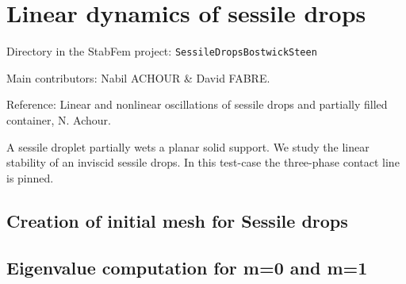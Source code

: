 


\chapter{Linear dynamics of sessile drops}

\begin{description}
\item{Directory in the StabFem project:}  \texttt{SessileDropsBostwickSteen}
\item{Main contributors:} Nabil ACHOUR \& David FABRE.
\item{Reference:} Linear and nonlinear oscillations of sessile drops and partially filled container, N. Achour.  
\end{description}

A sessile droplet partially wets a planar solid support. We study the linear stability of an inviscid sessile drops. In this test-case the three-phase contact line is pinned.

\section{Creation of initial mesh for Sessile drops}

\section{Eigenvalue computation for m=0 and m=1}